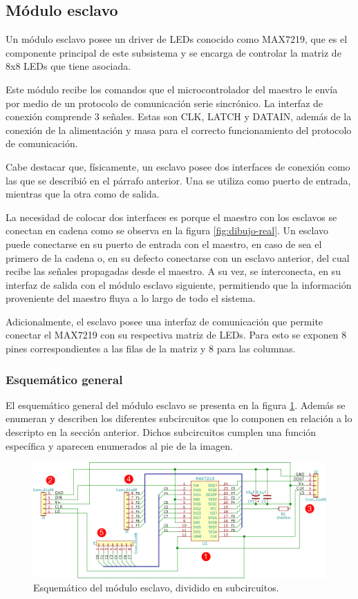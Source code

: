 \clearpage
\subsection{Módulo esclavo}
Un módulo esclavo posee un driver de LEDs conocido como MAX7219, que es el componente principal de este subsistema y se encarga de controlar la matriz de 8x8 LEDs que tiene asociada.

Este módulo recibe los comandos que el microcontrolador del maestro le envía por medio de un protocolo de comunicación serie sincrónico. La interfaz de conexión comprende 3 señales. Estas son CLK, LATCH y DATAIN, además de la conexión de la alimentación y masa para el correcto funcionamiento del protocolo de comunicación.

Cabe destacar que, físicamente, un esclavo posee dos interfaces de conexión como las que se describió en el párrafo anterior. Una se utiliza como puerto de entrada, mientras que la otra como de salida.

La necesidad de colocar dos interfaces es porque el maestro con los esclavos se conectan en cadena como se observa en la figura \ref{fig:dibujo-real}.
Un esclavo puede conectarse en su puerto de entrada con el maestro, en caso de sea el primero de la cadena o, en su defecto conectarse con un esclavo anterior, del cual recibe las señales propagadas desde el maestro.
A su vez, se interconecta, en su interfaz de salida con el módulo esclavo siguiente, permitiendo que la información proveniente del maestro fluya a lo largo de todo el sistema.

Adicionalmente, el esclavo posee una interfaz de comunicación que permite conectar el MAX7219 con su respectiva matriz de LEDs. Para esto se exponen 8 pines correspondientes a las filas de la matriz y 8 para las columnas.

\subsubsection{Esquemático general}
El esquemático general del módulo esclavo se presenta en la figura \ref{fig:esquematico-esclavo}.
Además se enumeran y describen los diferentes subcircuitos que lo componen en relación a lo descripto en la sección anterior.
Dichos subcircuitos cumplen una función específica y aparecen enumerados al pie de la imagen.

\begin{figure}[ht!]
	\centering
	\includegraphics[width=\linewidth]{imagenes/esquematico-slave.pdf}
	\caption{Esquemático del módulo esclavo, dividido en subcircuitos.}
	\label{fig:esquematico-esclavo}
\end{figure}


